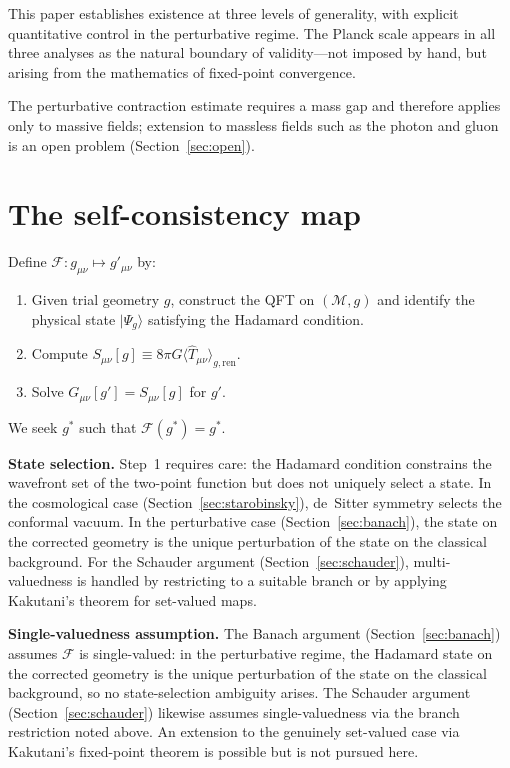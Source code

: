 \documentclass[12pt,a4paper]{article}
\begin{document}
This paper establishes existence at three levels of generality, with explicit
quantitative control in the perturbative regime. The Planck scale appears in all three
analyses as the natural boundary of validity---not imposed by hand, but arising from the
mathematics of fixed-point convergence.

\medskip\noindent The perturbative contraction estimate requires a mass gap and therefore applies only to massive fields; extension to massless fields such as the photon and gluon is an open problem (Section~\ref{sec:open}).

\section{The self-consistency map}
\label{sec:map}

Define $\mathcal{F}: g_{\mu\nu} \mapsto g'_{\mu\nu}$ by:
\begin{enumerate}
\item Given trial geometry $g$, construct the QFT on $(\mathcal{M},g)$ and identify the
physical state $|\Psi_g\rangle$ satisfying the Hadamard condition.
\item Compute $S_{\mu\nu}[g] \equiv 8\pi G\langle\hat{T}_{\mu\nu}\rangle_{g,\text{ren}}$.
\item Solve $G_{\mu\nu}[g'] = S_{\mu\nu}[g]$ for $g'$.
\end{enumerate}
We seek $g^*$ such that $\mathcal{F}(g^*) = g^*$.

\medskip\noindent\textbf{State selection.} Step~1 requires care: the Hadamard condition
constrains the wavefront set of the two-point function but does not uniquely select a
state. In the cosmological case (Section~\ref{sec:starobinsky}), de~Sitter symmetry
selects the conformal vacuum. In the perturbative case (Section~\ref{sec:banach}), the
state on the corrected geometry is the unique perturbation of the state on the classical
background. For the Schauder argument (Section~\ref{sec:schauder}), multi-valuedness is
handled by restricting to a suitable branch or by applying Kakutani's theorem for
set-valued maps.

\medskip\noindent\textbf{Single-valuedness assumption.} The Banach argument (Section~\ref{sec:banach}) assumes $\mathcal{F}$ is single-valued: in the perturbative regime, the Hadamard state on the corrected geometry is the unique perturbation of the state on the classical background, so no state-selection ambiguity arises. The Schauder argument (Section~\ref{sec:schauder}) likewise assumes single-valuedness via the branch restriction noted above. An extension to the genuinely set-valued case via Kakutani's fixed-point theorem is possible but is not pursued here.
\end{document}
